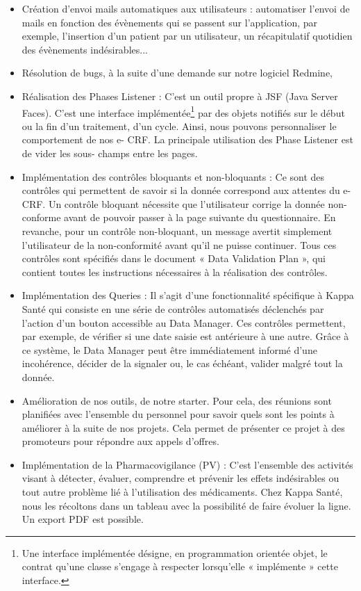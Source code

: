 \begin{itemize}
    \item Création d’envoi mails automatiques aux utilisateurs : automatiser l’envoi
    de mails en fonction des évènements qui se passent sur l’application, par
    exemple, l’insertion d’un
    patient par un utilisateur, un récapitulatif quotidien des évènements
    indésirables...
    \item Résolution de bugs, à la suite d’une demande sur notre logiciel Redmine,
    \item Réalisation des Phases Listener : C’est un outil propre à JSF (Java Server
    Faces). C’est une interface implémentée\footnote{Une interface implémentée désigne, en programmation orientée objet, le contrat qu’une classe s’engage à respecter lorsqu’elle « implémente » cette interface.} par des objets notifiés sur le début
    ou la fin d’un traitement,
    d’un cycle. Ainsi, nous pouvons personnaliser le comportement de nos e-
    CRF. La principale utilisation des Phase Listener est de vider les sous-
    champs entre les pages.
    \item Implémentation des contrôles bloquants et non-bloquants : Ce sont des
    contrôles qui permettent de savoir si la donnée correspond aux attentes du
    e-CRF. Un contrôle bloquant nécessite que l’utilisateur corrige la donnée non-conforme avant
    de pouvoir passer à la page suivante du questionnaire. En revanche, pour
    un contrôle non-bloquant, un message avertit simplement l’utilisateur de la
    non-conformité avant qu’il ne puisse continuer. Tous ces contrôles sont spécifiés dans le document « Data Validation Plan », qui contient toutes les
    instructions nécessaires à la réalisation des contrôles.
    \item Implémentation des Queries : Il s’agit d’une fonctionnalité spécifique à Kappa Santé qui consiste en une série de contrôles automatisés déclenchés par l’action d’un bouton accessible au Data Manager. Ces contrôles permettent, par exemple, de vérifier si une date saisie est antérieure à une autre. Grâce à ce système, le Data Manager peut être immédiatement informé d’une incohérence, décider de la signaler ou, le cas échéant, valider malgré tout la donnée.
    \item Amélioration de nos outils, de notre starter. Pour cela, des réunions sont planifiées avec l'ensemble du personnel pour savoir quels sont les points à améliorer à la suite de nos projets. Cela permet de présenter ce projet à des promoteurs pour répondre aux appels d'offres.
    \item Implémentation de la Pharmacovigilance (PV) : C'est l’ensemble des activités visant à détecter, évaluer, comprendre et prévenir les effets indésirables ou tout autre problème lié à l’utilisation des médicaments. Chez Kappa Santé, nous les récoltons dans un tableau avec la possibilité de faire évoluer la ligne. Un export PDF est possible.
\end{itemize}
\vspace{0.5cm}

